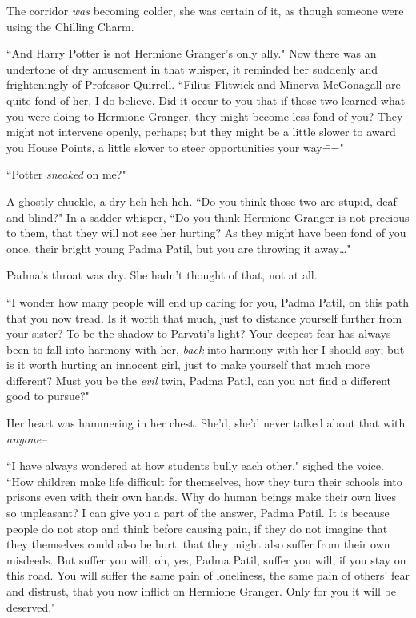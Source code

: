 The corridor \emph{was} becoming colder, she was certain of it, as though someone were using the Chilling Charm.

``And Harry Potter is not Hermione Granger's only ally." Now there was an undertone of dry amusement in that whisper, it reminded her suddenly and frighteningly of Professor Quirrell. ``Filius Flitwick and Minerva McGonagall are quite fond of her, I do believe. Did it occur to you that if those two learned what you were doing to Hermione Granger, they might become less fond of you? They might not intervene openly, perhaps; but they might be a little slower to award you House Points, a little slower to steer opportunities your way\==="

``Potter \emph{sneaked} on me?"

A ghostly chuckle, a dry heh-heh-heh. ``Do you think those two are stupid, deaf and blind?" In a sadder whisper, ``Do you think Hermione Granger is not precious to them, that they will not see her hurting? As they might have been fond of you once, their bright young Padma Patil, but you are throwing it away{\ldots}"

Padma's throat was dry. She hadn't thought of that, not at all.

``I wonder how many people will end up caring for you, Padma Patil, on this path that you now tread. Is it worth that much, just to distance yourself further from your sister? To be the shadow to Parvati's light? Your deepest fear has always been to fall into harmony with her, \emph{back} into harmony with her I should say; but is it worth hurting an innocent girl, just to make yourself that much more different? Must you be the \emph{evil} twin, Padma Patil, can you not find a different good to pursue?"

Her heart was hammering in her chest. She'd, she'd never talked about that with \emph{anyone\---}

``I have always wondered at how students bully each other," sighed the voice. ``How children make life difficult for themselves, how they turn their schools into prisons even with their own hands. Why do human beings make their own lives so unpleasant? I can give you a part of the answer, Padma Patil. It is because people do not stop and think before causing pain, if they do not imagine that they themselves could also be hurt, that they might also suffer from their own misdeeds. But suffer you will, oh, yes, Padma Patil, suffer you will, if you stay on this road. You will suffer the same pain of loneliness, the same pain of others' fear and distrust, that you now inflict on Hermione Granger. Only for you it will be deserved."

